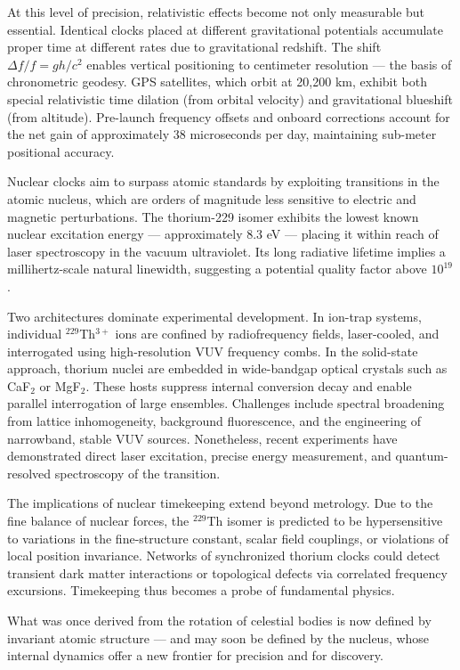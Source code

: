 At this level of precision, relativistic effects become not only measurable but essential. Identical clocks placed at different gravitational potentials accumulate proper time at different rates due to gravitational redshift. The shift $\Delta f/f = gh/c^2$ enables vertical positioning to centimeter resolution — the basis of chronometric geodesy. GPS satellites, which orbit at 20,200 km, exhibit both special relativistic time dilation (from orbital velocity) and gravitational blueshift (from altitude). Pre-launch frequency offsets and onboard corrections account for the net gain of approximately 38 microseconds per day, maintaining sub-meter positional accuracy.

Nuclear clocks aim to surpass atomic standards by exploiting transitions in the atomic nucleus, which are orders of magnitude less sensitive to electric and magnetic perturbations. The thorium-229 isomer exhibits the lowest known nuclear excitation energy — approximately 8.3 eV — placing it within reach of laser spectroscopy in the vacuum ultraviolet. Its long radiative lifetime implies a millihertz-scale natural linewidth, suggesting a potential quality factor above $10^{19}$.

Two architectures dominate experimental development. In ion-trap systems, individual $^{229}$Th$^{3+}$ ions are confined by radiofrequency fields, laser-cooled, and interrogated using high-resolution VUV frequency combs. In the solid-state approach, thorium nuclei are embedded in wide-bandgap optical crystals such as CaF$_2$ or MgF$_2$. These hosts suppress internal conversion decay and enable parallel interrogation of large ensembles. Challenges include spectral broadening from lattice inhomogeneity, background fluorescence, and the engineering of narrowband, stable VUV sources. Nonetheless, recent experiments have demonstrated direct laser excitation, precise energy measurement, and quantum-resolved spectroscopy of the transition.

The implications of nuclear timekeeping extend beyond metrology. Due to the fine balance of nuclear forces, the $^{229}$Th isomer is predicted to be hypersensitive to variations in the fine-structure constant, scalar field couplings, or violations of local position invariance. Networks of synchronized thorium clocks could detect transient dark matter interactions or topological defects via correlated frequency excursions. Timekeeping thus becomes a probe of fundamental physics.

What was once derived from the rotation of celestial bodies is now defined by invariant atomic structure — and may soon be defined by the nucleus, whose internal dynamics offer a new frontier for precision and for discovery.
